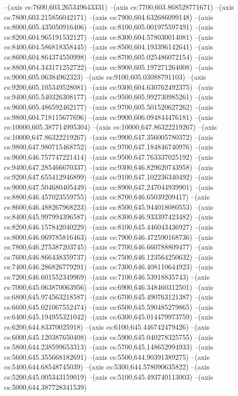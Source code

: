 --(axis cs:7600,603.265349643331)
--(axis cs:7700,603.868528771671)
--(axis cs:7800,603.215856042171)
--(axis cs:7900,604.632686099148)
--(axis cs:8000,605.435050916406)
--(axis cs:8100,605.001975597491)
--(axis cs:8200,604.965191532127)
--(axis cs:8300,604.578030014081)
--(axis cs:8400,604.586818358445)
--(axis cs:8500,604.193396142641)
--(axis cs:8600,604.864374550998)
--(axis cs:8700,605.025486072154)
--(axis cs:8800,604.343171252722)
--(axis cs:8900,605.197271264008)
--(axis cs:9000,605.06384962323)
--(axis cs:9100,605.03088791103)
--(axis cs:9200,605.105349528081)
--(axis cs:9300,604.630762492375)
--(axis cs:9400,605.540326308177)
--(axis cs:9500,605.992730985261)
--(axis cs:9600,605.486592462177)
--(axis cs:9700,605.501520627262)
--(axis cs:9800,604.718115677696)
--(axis cs:9900,606.094844476181)
--(axis cs:10000,605.387714995304)
--(axis cs:10000,647.86322219267)
--(axis cs:10000,647.86322219267)
--(axis cs:9900,647.356005780372)
--(axis cs:9800,647.980715468752)
--(axis cs:9700,647.184846740976)
--(axis cs:9600,646.757747221414)
--(axis cs:9500,647.763337025192)
--(axis cs:9400,647.285466670337)
--(axis cs:9300,646.829620743958)
--(axis cs:9200,647.655412946899)
--(axis cs:9100,647.102236340492)
--(axis cs:9000,647.504680405449)
--(axis cs:8900,647.247044939901)
--(axis cs:8800,646.457023559755)
--(axis cs:8700,646.65039209417)
--(axis cs:8600,646.488267968223)
--(axis cs:8500,645.944018080553)
--(axis cs:8400,645.997994396587)
--(axis cs:8300,646.933397423482)
--(axis cs:8200,646.157842040229)
--(axis cs:8100,645.446043436927)
--(axis cs:8000,646.069785816463)
--(axis cs:7900,646.472590168736)
--(axis cs:7800,646.275387203745)
--(axis cs:7700,646.660788809477)
--(axis cs:7600,646.866438359737)
--(axis cs:7500,646.123564250632)
--(axis cs:7400,646.286826779291)
--(axis cs:7300,646.408110644923)
--(axis cs:7200,646.601552349969)
--(axis cs:7100,646.53918835743)
--(axis cs:7000,645.063870063956)
--(axis cs:6900,646.348460312501)
--(axis cs:6800,645.974563218587)
--(axis cs:6700,645.490763121387)
--(axis cs:6600,645.021067552474)
--(axis cs:6500,645.590485279865)
--(axis cs:6400,645.194955321042)
--(axis cs:6300,645.014479973759)
--(axis cs:6200,644.83370025918)
--(axis cs:6100,645.446742479426)
--(axis cs:6000,645.120387650408)
--(axis cs:5900,645.040278325755)
--(axis cs:5800,644.238599653313)
--(axis cs:5700,645.148652994933)
--(axis cs:5600,645.355668182691)
--(axis cs:5500,644.90391389275)
--(axis cs:5400,644.68548745039)
--(axis cs:5300,644.578090635822)
--(axis cs:5200,645.005343159019)
--(axis cs:5100,645.493740113003)
--(axis cs:5000,644.387728341539)
